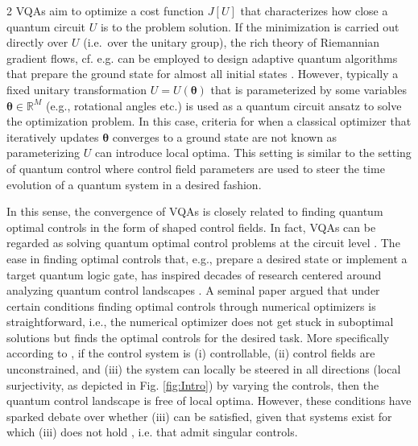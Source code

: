 \documentclass{article}
\renewcommand{\vec}[1]{\ensuremath{\boldsymbol{#1}}}
\begin{document}
\begin{multicols}{2}
VQAs aim to optimize a cost function $J[U]$ that characterizes how close a quantum circuit $U$ is to the problem solution. If the minimization is carried out directly over $U$ (i.e.~over the unitary group), the rich theory of Riemannian gradient flows, cf. e.g. \cite{Bro88+91, HM94, smith_optimization_1994, SGDH08, absil_optimization_2008, lee_first-order_2019} can be employed to design adaptive quantum algorithms \cite{ADAPTVQE,PhysRevA.107.062421, gluza_double-bracket_2025, mcmahon_equating_2025, suzuki_grovers_2025,  PhysRevResearch.5.033227, malvetti_randomized_2024} that  prepare the ground state for almost all initial states \cite{PhysRevResearch.5.033227,malvetti_randomized_2024,gluza_double-bracket_2025, mcmahon_equating_2025, suzuki_grovers_2025}. However, typically a fixed unitary transformation $U = U(\vec{\theta})$ that is parameterized by some variables $\vec{\theta}\in \mathbb R^{M}$ (e.g., rotational angles etc.) is used as a quantum circuit ansatz to solve the optimization problem. In this case, criteria for when a classical optimizer that iteratively updates $\vec{\theta}$ converges to a ground state are not known as parameterizing $U$ can introduce local optima.
This setting is similar to the setting of quantum control where control field parameters are used to steer the time evolution of a quantum system in a desired fashion.

In this sense, the convergence of VQAs is closely related to
finding quantum optimal controls in the form of shaped control fields. In fact, VQAs can be regarded as solving quantum optimal control problems at the circuit level \cite{PRXQuantum.2.010101}.
The ease in finding optimal controls that, e.g., prepare a desired state or implement a target quantum logic gate, has inspired decades of research centered around analyzing quantum control landscapes \cite{Chakrabarti01102007}. A seminal paper \cite{doi:10.1126/science.1093649}  argued that under certain conditions finding optimal controls through numerical optimizers is straightforward, i.e., the numerical optimizer does not get stuck in suboptimal solutions but finds the optimal controls for the desired task. 
More specifically according to \cite{Chakrabarti01102007, russell_control_2017}, if the control system is (i) controllable, (ii) control fields are unconstrained, and (iii) the system can locally be steered in all directions (local surjectivity, as depicted in Fig. \ref{fig:Intro}) by varying the controls, then the quantum control landscape is free of local optima. However, these conditions have sparked debate \cite{PhysRevLett.106.120402,PhysRevLett.108.198901} over whether (iii) can be satisfied, given that systems exist for which (iii) does not hold \cite{doi:10.1142/S0219025713500215,PhysRevA.86.013405}, i.e. that admit singular controls.


\end{multicols}
\end{document}
